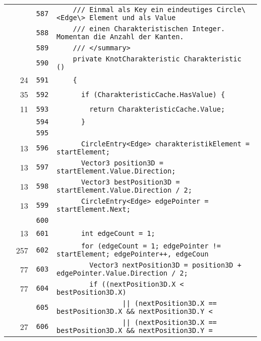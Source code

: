 \documentclass[a4paper,10pt]{article}
\begin{document}
\begin{longtable}[l]{lrrl}
\cellcolor{gray} &  & \verb~587~ & \verb~    /// Einmal als Key ein eindeutiges Circle\<Edge\> Element und als Value~\\
\cellcolor{gray} &  & \verb~588~ & \verb~    /// einen Charakteristischen Integer. Momentan die Anzahl der Kanten.~\\
\cellcolor{gray} &  & \verb~589~ & \verb~    /// </summary>~\\
\cellcolor{gray} &  & \verb~590~ & \verb~    private KnotCharakteristic Charakteristic ()~\\
\cellcolor{green} & 24 & \verb~591~ & \verb~    {~\\
\cellcolor{green} & 35 & \verb~592~ & \verb~      if (CharakteristicCache.HasValue) {~\\
\cellcolor{green} & 11 & \verb~593~ & \verb~        return CharakteristicCache.Value;~\\
\cellcolor{gray} &  & \verb~594~ & \verb~      }~\\
\cellcolor{gray} &  & \verb~595~ & \verb~~\\
\cellcolor{green} & 13 & \verb~596~ & \verb~      CircleEntry<Edge> charakteristikElement = startElement;~\\
\cellcolor{green} & 13 & \verb~597~ & \verb~      Vector3 position3D = startElement.Value.Direction;~\\
\cellcolor{green} & 13 & \verb~598~ & \verb~      Vector3 bestPosition3D = startElement.Value.Direction / 2;~\\
\cellcolor{green} & 13 & \verb~599~ & \verb~      CircleEntry<Edge> edgePointer = startElement.Next;~\\
\cellcolor{gray} &  & \verb~600~ & \verb~~\\
\cellcolor{green} & 13 & \verb~601~ & \verb~      int edgeCount = 1;~\\
\cellcolor{green} & 257 & \verb~602~ & \verb~      for (edgeCount = 1; edgePointer != startElement; edgePointer++, edgeCoun~\\
\cellcolor{green} & 77 & \verb~603~ & \verb~        Vector3 nextPosition3D = position3D + edgePointer.Value.Direction / 2;~\\
\cellcolor{green} & 77 & \verb~604~ & \verb~        if ((nextPosition3D.X < bestPosition3D.X)~\\
\cellcolor{gray} &  & \verb~605~ & \verb~                || (nextPosition3D.X == bestPosition3D.X && nextPosition3D.Y <~\\
\cellcolor{green} & 27 & \verb~606~ & \verb~                || (nextPosition3D.X == bestPosition3D.X && nextPosition3D.Y =~\\

\end{longtable}
\end{document}

